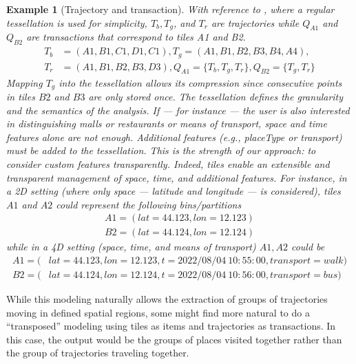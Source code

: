\documentclass[
]{ceurart}
\newtheorem{example}{Example}
\begin{document}
\begin{example}[Trajectory and transaction]
With reference to , where a regular tessellation is used for simplicity, $T_b,T_g$, and $T_r$ are trajectories while $Q_{A1}$ and $Q_{B2}$ are transactions that correspond to tiles A1 and B2.
{\small
\begin{align*}
    T_b&= (A1, B1, C1, D1, C1),
    T_g = (A1, B1, B2, B3, B4, A4),\\
    T_r&= (A1, B1, B2, B3, D3),Q_{A1}=\{T_b, T_g, T_r \},Q_{B2}= \{T_g, T_r \}
\end{align*}
}
\noindent Mapping $T_g$ into the tessellation allows its compression since consecutive points in tiles $B2$ and $B3$ are only stored once. 
The tessellation defines the granularity and the semantics of the analysis.
If --- for instance --- the user is also interested in distinguishing malls or restaurants or means of transport, space and time features alone are not enough.
Additional features (e.g., placeType or transport) must be added to the tessellation.
This is the strength of our approach: to consider custom features transparently.
Indeed, tiles enable an extensible and transparent management of space, time, and additional features.
For instance, in a 2D setting (where only space --- latitude and longitude --- is considered), tiles $A1$ and $A2$ could represent the following bins/partitions 
{\small
\begin{align*}
A1 = (lat=44.123, lon=12.123)\\
B2 = (lat=44.124, lon=12.124)   
\end{align*}}
\noindent while in a 4D setting (space, time, and means of transport) $A1,A2$ could be
{\small
\begin{align*}
A1 = (&lat=44.123, lon=12.123, t=2022/08/04~10:55:00, transport=walk)\\
B2 = (&lat=44.124, lon=12.124, t=2022/08/04~10:56:00, transport=bus)
\end{align*}}
\end{example}
%
While this modeling naturally allows the extraction of groups of trajectories moving in defined spatial regions, some might find more natural to do a ``transposed'' modeling using tiles as items and trajectories as transactions.
In this case, the output would be the groups of places visited together rather than the group of trajectories traveling together.
\end{document}
